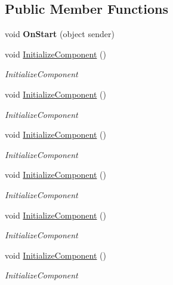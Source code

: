 \subsection*{Public Member Functions}
\begin{DoxyCompactItemize}
\item 
\mbox{\label{class_t_h_b___plugin___exams_1_1_exams_monitor_1_1_page_a1fe972efc415ed5c2a43f9463165fd93}} 
void {\bfseries On\+Start} (object sender)
\item 
void \mbox{\hyperlink{class_t_h_b___plugin___exams_1_1_exams_monitor_1_1_page_ab0fefb3d9540c12aa45fb516ba4355b3}{Initialize\+Component}} ()
\begin{DoxyCompactList}\small\item\em Initialize\+Component \end{DoxyCompactList}\item 
void \mbox{\hyperlink{class_t_h_b___plugin___exams_1_1_exams_monitor_1_1_page_ab0fefb3d9540c12aa45fb516ba4355b3}{Initialize\+Component}} ()
\begin{DoxyCompactList}\small\item\em Initialize\+Component \end{DoxyCompactList}\item 
void \mbox{\hyperlink{class_t_h_b___plugin___exams_1_1_exams_monitor_1_1_page_ab0fefb3d9540c12aa45fb516ba4355b3}{Initialize\+Component}} ()
\begin{DoxyCompactList}\small\item\em Initialize\+Component \end{DoxyCompactList}\item 
void \mbox{\hyperlink{class_t_h_b___plugin___exams_1_1_exams_monitor_1_1_page_ab0fefb3d9540c12aa45fb516ba4355b3}{Initialize\+Component}} ()
\begin{DoxyCompactList}\small\item\em Initialize\+Component \end{DoxyCompactList}\item 
void \mbox{\hyperlink{class_t_h_b___plugin___exams_1_1_exams_monitor_1_1_page_ab0fefb3d9540c12aa45fb516ba4355b3}{Initialize\+Component}} ()
\begin{DoxyCompactList}\small\item\em Initialize\+Component \end{DoxyCompactList}\item 
void \mbox{\hyperlink{class_t_h_b___plugin___exams_1_1_exams_monitor_1_1_page_ab0fefb3d9540c12aa45fb516ba4355b3}{Initialize\+Component}} ()
\begin{DoxyCompactList}\small\item\em Initialize\+Component \end{DoxyCompactList}\end{DoxyCompactItemize}
